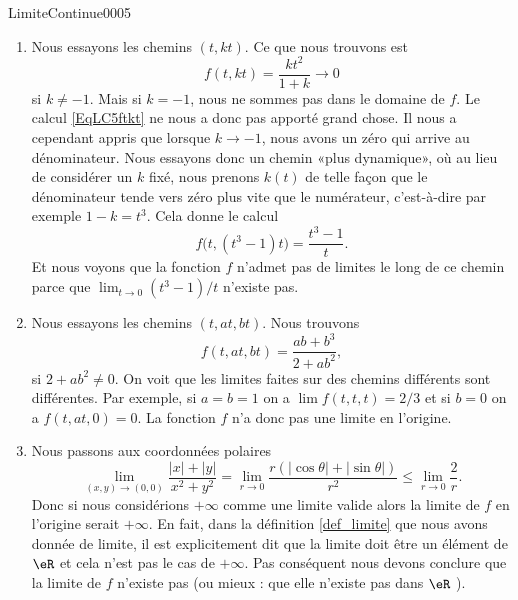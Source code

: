 \begin{corrige}{LimiteContinue0005}

	\begin{enumerate}
		\item
			Nous essayons les chemins $(t,kt)$. Ce que nous trouvons est
			\begin{equation}		\label{EqLC5ftkt}
				f(t,kt)=\frac{ kt^2 }{ 1+k }\to 0
			\end{equation}
			si $k\neq -1$. Mais si $k=-1$, nous ne sommes pas dans le domaine de $f$. Le calcul \eqref{EqLC5ftkt} ne nous a donc pas apporté grand chose. Il nous a cependant appris que lorsque $k\to -1$, nous avons un zéro qui arrive au dénominateur. Nous essayons donc un chemin «plus dynamique», où au lieu de considérer un $k$ fixé, nous prenons $k(t)$ de telle façon que le dénominateur tende vers zéro plus vite que le numérateur, c'est-à-dire par exemple $1-k=t^3$. Cela donne le calcul
			\begin{equation}
				f\big( t,(t^3-1)t \big)=\frac{ t^3-1 }{ t }.
			\end{equation}
			Et nous voyons que la fonction $f$ n'admet pas de limites le long de ce chemin parce que $\lim_{t\to 0} (t^3-1)/t$ n'existe pas.
                        \item Nous essayons les chemins $(t, at, bt)$. Nous trouvons
                          \begin{equation}
                            f(t,at,bt) = \frac{ab+b^3}{2+ab^2},
                          \end{equation}
                          si $2+ab^2\neq 0$. On voit que les limites faites sur des chemins différents sont différentes. Par exemple, si $a=b=1$ on a $\lim f (t,t,t)= 2/3$ et si $b=0$ on a $f(t,at, 0)= 0$. La fonction $f$ n'a donc pas une limite en l'origine.
                          \item Nous passons aux coordonnées polaires
                            \begin{equation}
                              \lim_{(x,y)\to (0,0)}\frac{|x|+|y|}{x^2+y^2}=\lim_{r\to 0}\frac{r(|\cos \theta|+|\sin \theta|)}{r^2}\leq \lim_{r\to 0} \frac{2}{r}. 
                            \end{equation}
                            Donc si nous considérions $+\infty$ comme une limite valide alors  la limite de $f$ en l'origine  serait $+\infty$. En fait, dans la définition \ref{def_limite} que nous avons donnée de limite, il est explicitement dit que la limite doit être un élément de $\eR$ et cela n'est pas le cas de $+\infty$. Pas conséquent nous devons conclure que la limite de $f$  n'existe pas (ou mieux : que elle n'existe pas dans $\eR$ ). 

\end{enumerate}
\end{corrige}
